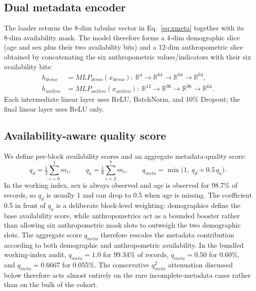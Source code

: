 \documentclass[mathematics,article,submit,pdftex]{Definitions/mdpi}
\def\mathrm#1{#1}%
\def\mathbf#1{#1}%
\begin{document}
\subsection{Dual metadata encoder}
The loader returns the 8-dim tabular vector in Eq.~\eqref{eq:xmeta} together with its 8-dim availability mask. The model therefore forms a 4-dim demographic slice (age and sex plus their two availability bits) and a 12-dim anthropometric slice obtained by concatenating the six anthropometric values/indicators with their six availability bits:
\begin{align}
\mathbf{h}_{\mathrm{demo}}   &= \mathrm{MLP}_{\mathrm{demo}}(\mathbf{x}_{\mathrm{demo}}):\ \mathbb{R}^{4}\to\mathbb{R}^{64}\to\mathbb{R}^{64}\to\mathbb{R}^{64}, \\
\mathbf{h}_{\mathrm{anthro}} &= \mathrm{MLP}_{\mathrm{anthro}}(\mathbf{x}_{\mathrm{anthro}}):\ \mathbb{R}^{12}\to\mathbb{R}^{96}\to\mathbb{R}^{96}\to\mathbb{R}^{64}.
\end{align}
Each intermediate linear layer uses ReLU, BatchNorm, and 10\% Dropout; the final linear layer uses ReLU only.

\subsection{Availability-aware quality score}
We define per-block availability scores and an aggregate metadata-quality score:
\begin{equation}\label{eq:qmeta}
q_{d} = \tfrac{1}{2}\sum_{i=0}^{1} m_i, \qquad
q_{a} = \tfrac{1}{6}\sum_{i=2}^{7} m_i, \qquad
q_{\mathrm{meta}} = \min\!\bigl(1,\ q_{d} + 0.5\,q_{a}\bigr).
\end{equation}
In the working index, sex is always observed and age is observed for 98.7\% of records, so $q_d$ is usually 1 and can drop to 0.5 when age is missing. The coefficient 0.5 in front of $q_a$ is a deliberate block-level weighting: demographics define the base availability score, while anthropometrics act as a bounded booster rather than allowing six anthropometric mask slots to outweigh the two demographic slots. The aggregate score $q_{\mathrm{meta}}$ therefore rescales the metadata contribution according to both demographic and anthropometric availability.
In the bundled working-index audit, $q_{\mathrm{meta}}{=}1.0$ for 99.34\% of records, $q_{\mathrm{meta}}{=}0.50$ for 0.60\%, and $q_{\mathrm{meta}}{=}0.6667$ for 0.055\%. The conservative $q_{\mathrm{meta}}^2$ attenuation discussed below therefore acts almost entirely on the rare incomplete-metadata cases rather than on the bulk of the cohort.
\end{document}
